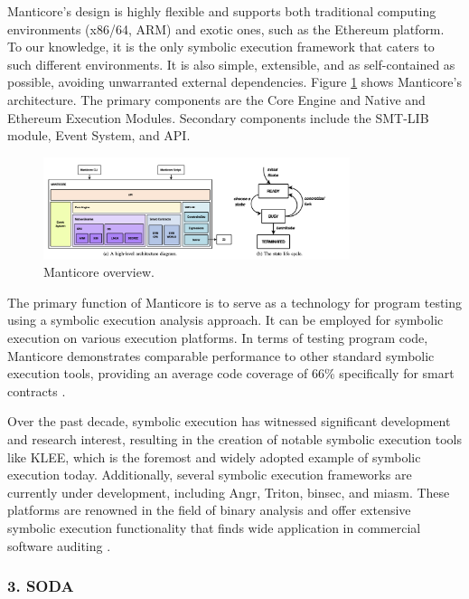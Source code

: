 Manticore’s design is highly flexible and supports both
traditional computing environments (x86/64, ARM) and exotic
ones, such as the Ethereum platform. To our knowledge,
it is the only symbolic execution framework that caters to
such different environments. It is also simple, extensible, and
as self-contained as possible, avoiding unwarranted external
dependencies. Figure \ref{fig:Manticore overview} shows Manticore’s architecture. The primary
components are the Core Engine and Native and Ethereum
Execution Modules. Secondary components include the  \ac{SMT-LIB} module, Event System,
and API.

\begin{figure}[H]
 \centering
  \includegraphics[width=0.8\textwidth]{manitcore overview.png}
  \caption{Manticore overview.}
  \label{fig:Manticore overview}
\end{figure}

The primary function of Manticore is to serve as a technology for program testing using a symbolic execution analysis approach. It can be employed for symbolic execution on various execution platforms. In terms of testing program code, Manticore demonstrates comparable performance to other standard symbolic execution tools, providing an average code coverage of 66\% specifically for smart contracts \cite{mossberg2019manticore}.
        
Over the past decade, symbolic execution has witnessed significant development and research interest, resulting in the creation of notable symbolic execution tools like KLEE, which is the foremost and widely adopted example of symbolic execution today. Additionally, several symbolic execution frameworks are currently under development, including Angr, Triton, binsec, and miasm. These platforms are renowned in the field of binary analysis and offer extensive symbolic execution functionality that finds wide application in commercial software auditing \cite{mossberg2019manticore}.

\subsubsection{3. \ac{SODA}}


